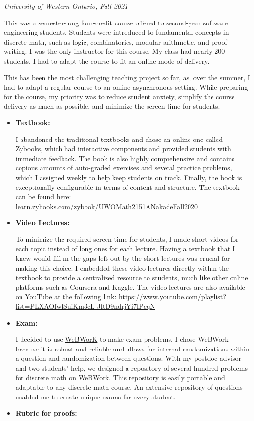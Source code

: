 \documentclass[
]{report}
\begin{document}
\emph{University of Western Ontario, Fall 2021}

This was a semester-long four-credit course offered to second-year software engineering students. Students were introduced to fundamental concepts in discrete math, such as logic, combinatorics, modular arithmetic, and proof-writing. I was the only instructor for this course. My class had nearly 200 students. I had to adapt the course to fit an online mode of delivery.

This has been the most challenging teaching project so far, as, over the summer, I had to adapt a regular course to an online asynchronous setting. While preparing for the course, my priority was to reduce student anxiety, simplify the course delivery as much as possible, and minimize the screen time for students.

\begin{itemize}
\item
  \textbf{Textbook:}

  I abandoned the traditional textbooks and chose an online one called \href{https://learn.zybooks.com/zybook/UWOMath2151ANakadeFall2020}{Zybooks}, which had interactive components and provided students with immediate feedback. The book is also highly comprehensive and contains copious amounts of auto-graded exercises and several practice problems, which I assigned weekly to help keep students on track. Finally, the book is exceptionally configurable in terms of content and structure. The textbook can be found here:
  \href{https://learn.zybooks.com/zybook/UWOMath2151ANakadeFall2020}{learn.zybooks.com/zybook/UWOMath2151ANakadeFall2020}
\item
  \textbf{Video Lectures:}

  To minimize the required screen time for students, I made short videos for each topic instead of long ones for each lecture. Having a textbook that I knew would fill in the gaps left out by the short lectures was crucial for making this choice. I embedded these video lectures directly within the textbook to provide a centralized resource to students, much like other online platforms such as Coursera and Kaggle.
  The video lectures are also available on YouTube at the following link: \url{https://www.youtube.com/playlist?list=PLXAOfwfSuiKm3cL-JftD9ndrjYi7fPcqN}
\item
  \textbf{Exam:}

  I decided to use \href{https://webwork.maa.org}{WeBWorK} to make exam problems.
  I chose WeBWork because it is robust and reliable and allows for internal randomizations within a question and randomization between questions. With my postdoc advisor and two students' help, we designed a repository of several hundred problems for discrete math on WeBWork. This repository is easily portable and adaptable to any discrete math course. An extensive repository of questions enabled me to create unique exams for every student.
\item
  \textbf{Rubric for proofs:}


\end{itemize}
\end{document}
